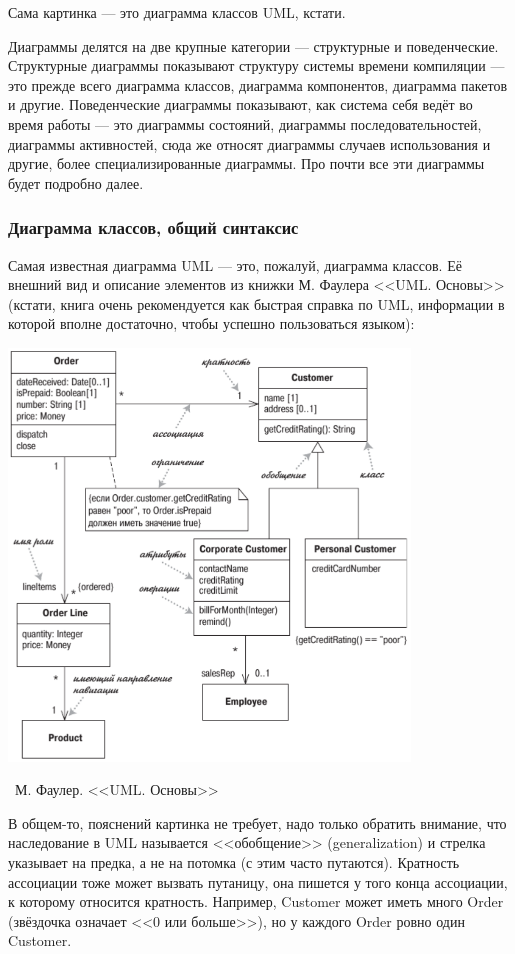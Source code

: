 \documentclass[a5paper]{article}
\newcommand{\attribution}[1] {
    \vspace{-5mm}\begin{flushright}\begin{scriptsize}%
    {\textcopyright\, #1}\end{scriptsize}\end{flushright}
}
\begin{document}
Сама картинка --- это диаграмма классов UML, кстати.

Диаграммы делятся на две крупные категории --- структурные и поведенческие. Структурные диаграммы показывают структуру системы времени компиляции --- это прежде всего диаграмма классов, диаграмма компонентов, диаграмма пакетов и другие. Поведенческие диаграммы показывают, как система себя ведёт во время работы --- это диаграммы состояний, диаграммы последовательностей, диаграммы активностей, сюда же относят диаграммы случаев использования и другие, более специализированные диаграммы. Про почти все эти диаграммы будет подробно далее.

\subsubsection{Диаграмма классов, общий синтаксис}

Самая известная диаграмма UML --- это, пожалуй, диаграмма классов. Её внешний вид и описание элементов из книжки М. Фаулера <<UML. Основы>> (кстати, книга очень рекомендуется как быстрая справка по UML, информации в которой вполне достаточно, чтобы успешно пользоваться языком):

\begin{center}
    \includegraphics[width=0.8\textwidth]{umlClassDiagram.png}
    \attribution{М. Фаулер. <<UML. Основы>>}
\end{center}

В общем-то, пояснений картинка не требует, надо только обратить внимание, что наследование в UML называется <<обобщение>> (generalization) и стрелка указывает на предка, а не на потомка (с этим часто путаются). Кратность ассоциации тоже может вызвать путаницу, она пишется у того конца ассоциации, к которому относится кратность. Например, Customer может иметь много Order (звёздочка означает <<0 или больше>>), но у каждого Order ровно один Customer. 
\end{document}
